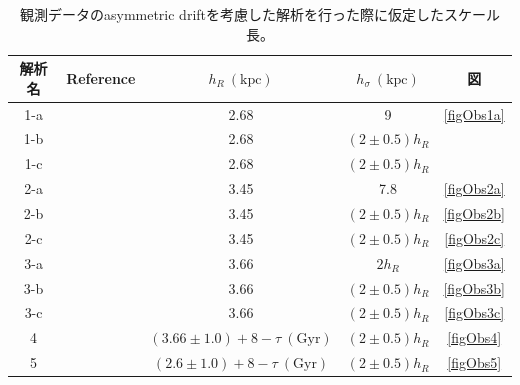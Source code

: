 \begin{table}
\begin{center}
\begin{tabular}{c|l|c|c|c} \hline
 \rowcolor{LightCyan}
 解析名 & Reference & $h_R\ \mathrm{(kpc)}$ & $h_{\sigma}\ \mathrm{(kpc)}$ & 図\\
 \hline
  1-a & \multirow{3}{*}{\cite{Piffl14}} & 2.68 & 9 & \ref{figObs1a}\\
  1-b && 2.68 & $(2\pm 0.5)h_R$ & \\
  1-c && 2.68 & $(2\pm 0.5)h_R$ & \tabularnewline[\doublerulesep]
 \hline
  2-a & \multirow{3}{*}{\cite{SB15}} & 3.45 & 7.8 & \ref{figObs2a}\\
  2-b && 3.45 & $(2\pm 0.5)h_R$ & \ref{figObs2b}\\
  2-c && 3.45 & $(2\pm 0.5)h_R$ & \ref{figObs2c} \tabularnewline[\doublerulesep]
 \hline
  3-a & \multirow{3}{*}{\cite{BP15}} & 3.66 & $2h_R$ & \ref{figObs3a}\\
  3-b && 3.66 & $(2\pm 0.5)h_R$ & \ref{figObs3b}\\
  3-c && 3.66 & $(2\pm 0.5)h_R$ & \ref{figObs3c} \tabularnewline[\doublerulesep]
 \hline
  4 & \cite{BP15} & $(3.66 \pm 1.0) + 8 - \tau\ (\mathrm{Gyr})$ & $(2\pm 0.5)h_R$ & \ref{figObs4}\\
 \hline
  5 & \cite{BH2016} & $(2.6 \pm 1.0) + 8 - \tau\ (\mathrm{Gyr})$ & $(2\pm 0.5)h_R$ & \ref{figObs5}\\
 \hline
\end{tabular} \label{scalelength}
\caption{観測データのasymmetric driftを考慮した解析を行った際に仮定したスケール長。}
\end{center}
\end{table}



